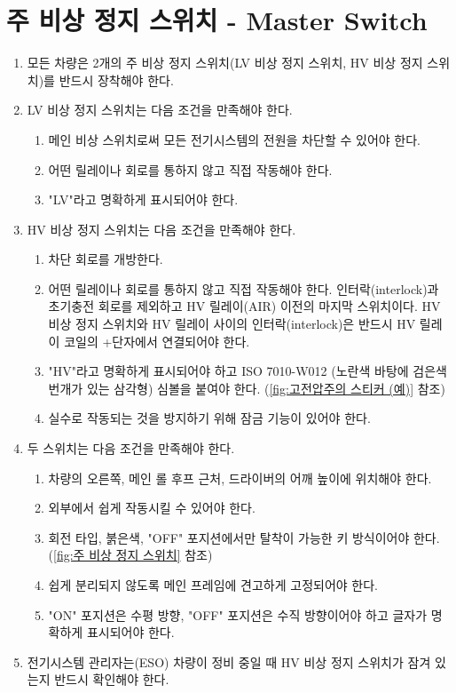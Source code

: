 \documentclass[final,a4paper,10pt]{report}
\begin{document}
\section{주 비상 정지 스위치 - Master Switch} \label{section:주 비상 정지 스위치}
\begin{enumerate}
  \item 모든 차량은 2개의 주 비상 정지 스위치(LV 비상 정지 스위치, HV 비상 정지 스위치)를 반드시 장착해야 한다.
  
  \item LV 비상 정지 스위치는 다음 조건을 만족해야 한다.
    \begin{enumerate}
      \item 메인 비상 스위치로써 모든 전기시스템의 전원을 차단할 수 있어야 한다.
      \item 어떤 릴레이나 회로를 통하지 않고 직접 작동해야 한다.
      \item "LV"라고 명확하게 표시되어야 한다.
    \end{enumerate}
    
  \item HV 비상 정지 스위치는 다음 조건을 만족해야 한다.
    \begin{enumerate}
      \item 차단 회로를 개방한다.
      \item 어떤 릴레이나 회로를 통하지 않고 직접 작동해야 한다. 인터락(interlock)과 초기충전 회로를 제외하고 HV 릴레이(AIR) 이전의 마지막 스위치이다. HV 비상 정지 스위치와 HV 릴레이 사이의 인터락(interlock)은 반드시 HV 릴레이 코일의 +단자에서 연결되어야 한다.
      \item "HV"라고 명확하게 표시되어야 하고 ISO 7010-W012 (노란색 바탕에 검은색 번개가 있는 삼각형) 심볼을 붙여야 한다. (\cref{fig:고전압주의 스티커 (예)} 참조)
      \item 실수로 작동되는 것을 방지하기 위해 잠금 기능이 있어야 한다.
    \end{enumerate}
    
  \item 두 스위치는 다음 조건을 만족해야 한다.
    \begin{enumerate}
      \item 차량의 오른쪽, 메인 롤 후프 근처, 드라이버의 어깨 높이에 위치해야 한다.
      \item 외부에서 쉽게 작동시킬 수 있어야 한다.
      \item 회전 타입, 붉은색, "OFF" 포지션에서만 탈착이 가능한 키 방식이어야 한다. (\cref{fig:주 비상 정지 스위치} 참조)
      \item 쉽게 분리되지 않도록 메인 프레임에 견고하게 고정되어야 한다.
      \item "ON" 포지션은 수평 방향, "OFF" 포지션은 수직 방향이어야 하고 글자가 명확하게 표시되어야 한다.
    \end{enumerate}
    
  \item 전기시스템 관리자는(ESO) 차량이 정비 중일 때 HV 비상 정지 스위치가 잠겨 있는지 반드시 확인해야 한다.
\end{enumerate}
\end{document}

